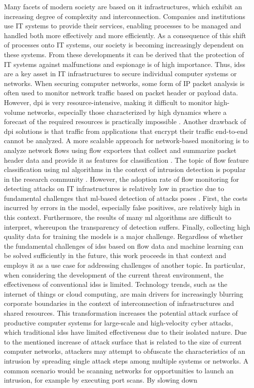\documentclass[../../main.tex]{subfiles}
\begin{document}
Many facets of modern society are based on \gls{it} infrastructures, which exhibit an increasing degree of complexity and interconnection. Companies and institutions use IT systems to provide their services, enabling processes to be managed and handled both more effectively and more efficiently. As a consequence of this shift of processes onto IT systems, our society is becoming increasingly dependent on these systems. From these developments it can be derived that the protection of IT systems against malfunctions and espionage is of high importance. Thus, \glspl{ids} are a key asset in IT infrastructures to secure individual computer systems or networks. When securing computer networks, some form of IP packet analysis is often used to monitor network traffic based on packet header or payload data.
However, \gls{dpi} is very resource-intensive, making it difficult to monitor high-volume networks, especially those characterized by high dynamics where a forecast of the required resources is practically impossible \cite{dreger2004operational}. Another drawback of \gls{dpi} solutions is that traffic from applications that encrypt their traffic end-to-end cannot be analyzed. A more scalable approach for network-based monitoring is to analyze network flows using flow exporters that collect and summarize packet header data and provide it as features for classification \cite{hofstede2018flow}. The topic of flow feature classification using \gls{ml} algorithms in the context of intrusion detection is popular in the research community  \cite{ahmad2021network}. However, the adoption rate of flow monitoring for detecting attacks on IT infrastructures is relatively low in practice due to fundamental challenges that \gls{ml}-based detection of attacks poses \cite{som_2010}. First, the costs incurred by errors in the model, especially false positives, are relatively high in this context. Furthermore, the results of many \gls{ml} algorithms are difficult to interpret, whereupon the transparency of detection suffers. Finally, collecting high quality data for training the models is a major challenge. Regardless of whether the fundamental challenges of \glspl{ids} based on flow data and machine learning can be solved sufficiently in the future, this work proceeds in that context and employs it as a use case for addressing challenges of another topic. In particular, when considering the development of the current threat environment, the effectiveness of conventional \glspl{ids} is limited. Technology trends, such as the internet of things or cloud computing, are main drivers for increasingly blurring corporate boundaries in the context of interconnection of infrastructures and shared resources. This transformation increases the potential attack surface of productive computer systems for large-scale and high-velocity cyber attacks, which traditional \glspl{ids} have limited effectiveness due to their isolated nature. Due to the mentioned increase of attack surface that is related to the size of current computer networks, attackers may attempt to obfuscate the characteristics of an intrusion by spreading single attack steps among multiple systems or networks. A common scenario would be scanning networks for opportunities to launch an intrusion, for example by executing port scans. By slowing down 
\end{document}
